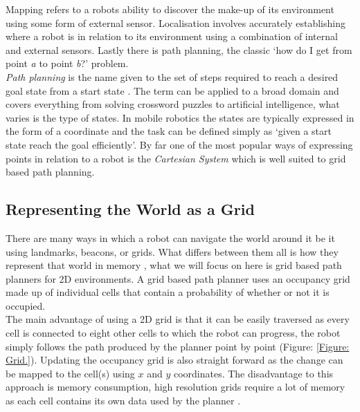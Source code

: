 \noindent
Mapping refers to a robots ability to discover the make-up of its environment using some form of external sensor. Localisation involves accurately establishing where a robot is in relation to its environment using a combination of internal and external sensors. Lastly there is path planning, the classic `how do I get from point \textit{a} to point \textit{b}?' problem.\\

\noindent
\textit{Path planning} is the name given to the set of steps required to reach a desired goal state from a start state \cite{HEURISTIC}. The term can be applied to a broad domain and covers everything from solving crossword puzzles to artificial intelligence, what varies is the type of states. In mobile robotics the states are typically expressed in the form of a coordinate and the task can be defined simply as `given a start state reach the goal efficiently'. By far one of the most popular ways of expressing points in relation to a robot is the \textit{Cartesian System} \cite{NEH} which is well suited to grid based path planning.

\newpage

\subsection{Representing the World as a Grid}

\noindent
There are many ways in which a robot can navigate the world around it be it using landmarks, beacons, or grids. What differs between them all is how they represent that world in memory \cite{GRIDNAV95}, what we will focus on here is grid based path planners for 2D environments. A grid based path planner uses an occupancy grid made up of individual cells that contain a probability of whether or not it is occupied.\\

\noindent
The main advantage of using a 2D grid is that it can be easily traversed as every cell is connected to eight other cells to which the robot can progress, the robot simply follows the path produced by the planner point by point (Figure: \ref{Figure: Grid.}). Updating the occupancy grid is also straight forward as the change can be mapped to the cell(s) using $x$ and $y$ coordinates. The disadvantage to this approach is memory consumption, high resolution grids require a lot of memory as each cell contains its own data used by the planner \cite{GRIDNAV95}.


